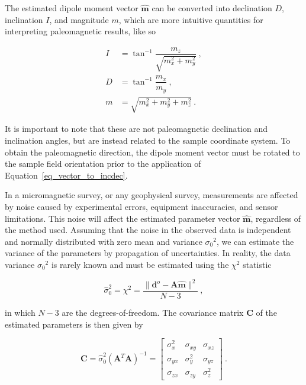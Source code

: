 \noindent
The estimated dipole moment vector $\hat{\mathbf{m}}$ can be converted into declination $D$, inclination $I$, and magnitude $m$, which are more intuitive quantities for interpreting paleomagnetic results, like so \citep{Tauxe2018}

\begin{equation}
\label{eq_vector_to_incdec}
\begin{aligned}
I &= \tan^{-1}\dfrac{m_z}{\sqrt{m_x^2 + m_y^2}} \ , \\
D &= \tan^{-1}\dfrac{m_x}{m_y} \ , \\
m &= \sqrt{m_x^2 + m_y^2 + m_z^2} \ .
\end{aligned}
\end{equation}

\noindent
It is important to note that these are not paleomagnetic declination and inclination angles, but are instead related to the sample coordinate system. To obtain the paleomagnetic direction, the dipole moment vector must be rotated to the sample field orientation prior to the application of Equation~\ref{eq_vector_to_incdec}.

In a micromagnetic survey, or any geophysical survey, measurements are affected by noise caused by experimental errors, equipment inaccuracies, and sensor limitations. This noise will affect the estimated parameter vector $\mathbf{\hat{m}}$, regardless of the method used. Assuming that the noise in the observed data is independent and normally distributed with zero mean and variance ${\sigma_0}^2$, we can estimate the variance of the parameters by propagation of uncertainties. In reality, the data variance  ${\sigma_0}^2$ is rarely known and must be estimated using the $\chi^2$ statistic \citep{Aster2019}

\begin{equation}
\label{eq_chi_square}
\hat{\sigma}_0^2 = {\chi}^2 = \dfrac{\|\mathbf{d}^o - \mathbf{A}\hat{\mathbf{m}}\|^2}{N - 3}\ ,
\end{equation}

\noindent
in which $N - 3$  are the degrees-of-freedom.
The covariance matrix $\mathbf{C}$ of the estimated parameters is then given by \citep{Aster2019}

\begin{equation}
\label{eq_covariance}
\mathbf{C}
=
\hat{\sigma}_0^2 (\mathbf{A}^T\mathbf{A})^{-1}
=
\begin{bmatrix}
\sigma_x^2 & \sigma_{xy} & \sigma_{xz} \\
\sigma_{yx} & \sigma_y^2 & \sigma_{yz} \\
\sigma_{zx} & \sigma_{zy} & \sigma_z^2
\end{bmatrix}
\ .
\end{equation}

